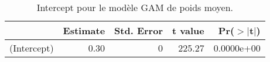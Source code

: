 \begin{table}[!ht]
\centering
\begin{tabular}{rrrrr}
  \hline
 & Estimate & Std. Error & t value & Pr($>$$|$t$|$) \\ 
  \hline
(Intercept) & 0.30 &    0 & 225.27 & 0.0000e+00 \\ 
   \hline
\end{tabular}
\caption{Intercept pour le modèle GAM de poids moyen.} 
\label{smpm.pc}
\end{table}
